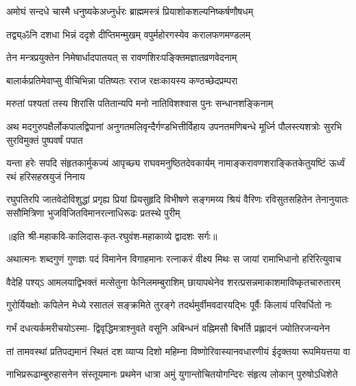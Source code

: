 \twolineshloka
{अमोघं सन्दधे चास्मै धनुष्यकेअध्नुर्धरः}
{ब्राह्ममस्त्रं प्रियाशोकशल्यनिष्कर्षणौषधम्} %

\twolineshloka
{तद्व्य्ॐनि दशधा भिन्नं ददृशे दीप्तिमन्मुखम्}
{वपुर्महोरगस्येव करालफणमण्डलम्} %

\twolineshloka
{तेन मन्त्रप्रयुक्तेन निमेषार्धादपातयत्}
{स रावणशिरःपङ्क्तिमज्ञातव्रणवेदनाम्} %

\twolineshloka
{बालार्कप्रतिमेवाप्सु वीचिभिन्ना पतिष्यतः}
{रराज रक्षःकायस्य कण्ठच्छेदप्रम्परा} %

\twolineshloka
{मरुतां पश्यतां तस्य शिरांसि पतितान्यपि}
{मनो नातिविशश्वास पुनः सन्धानशङ्किनाम्} %

\fourlineindentedshloka
{अथ मदगुरुपक्षैर्लोकपालद्विपानां}
{अनुगतमलिवृन्दैर्गण्डभित्तीर्विहाय}
{उपनतमणिबन्धे मूर्ध्नि पौलस्त्यशत्रोः}
{सुरभि सुरविमुक्तं पुष्पवर्षं पपात} %

\fourlineindentedshloka
{यन्ता हरेः सपदि संहृतकार्मुकज्यं}
{आपृच्छ्य राघवमनुष्ठितदेवकार्यम्}
{नामाङ्करावणशराङ्कितकेतुयष्टिं}
{ऊर्ध्वं रथं हरिसहस्रयुजं निनाय} %

\fourlineindentedshloka
{रघुपतिरपि जातवेदोविशुद्धां प्रगृह्य प्रियां}
{प्रियसुहृदि विभीषणे सङ्गमय्य श्रियं वैरिणः}
{रविसुतसहितेन तेनानुयातः ससौमित्रिणा}
{भुजविजितविमानरत्नाधिरूढः प्रतस्थे पुरीम्} %

॥इति श्री-महाकवि-कालिदास-कृत-रघुवंश-महाकाव्ये द्वादशः सर्गः॥


\fourlineindentedshloka
{अथात्मनः शब्दगुणं गुणज्ञः}
{पदं विमानेन विगाहमानः}
{रत्नाकरं वीक्ष्य मिथः स जायां}
{रामाभिधानो हरिरित्युवाच} %

\twolineshloka
{वैदेहि पश्य्ऽ आमलयाद्विभक्तं मत्सेतुना फेनिलमम्बुराशिम्}
{छायापथेनेव शरत्प्रसन्नमाकाशमाविष्कृतचारुतारम्} %

\fourlineindentedshloka
{गुरोर्यियक्षोः कपिलेन मेध्ये}
{रसातलं सङ्क्रमिते तुरङ्गे}
{तदर्थमुर्वीमवदारयद्भिः}
{पूर्वैः किलायं परिवर्धितो नः} %

\fourlineindentedshloka
{गर्भं दधत्यर्कमरीचयोऽस्मा-}
{द्विवृद्धिमत्राश्नुवते वसूनि}
{अबिन्धनं वह्निमसौ बिभर्ति}
{प्रह्लादनं ज्योतिरजन्यनेन} %

\fourlineindentedshloka
{तां तामवस्थां प्रतिपद्यमानं}
{स्थितं दश व्याप्य दिशो महिम्ना}
{विष्णोरिवास्यानवधारणीयं}
{ईदृक्तया रूपमियत्तया वा} %

\fourlineindentedshloka
{नाभिप्ररूढाम्बुरुहासनेन}
{संस्तूयमानः प्रथमेन धात्रा}
{अमुं युगान्तोचितयोगन्दिरः}
{संहृत्य लोकान् पुरुषोऽधिशेते} %

